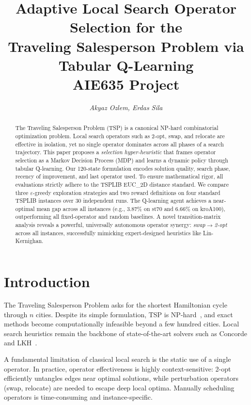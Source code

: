 \documentclass[10pt,twocolumn]{article}
\title{\textbf{Adaptive Local Search Operator Selection for the\\
Traveling Salesperson Problem via Tabular Q-Learning \\AIE635 Project}}
\author{\textit{Akyaz Ozlem, Erdas Sila}}
\date{}
\begin{document}
\maketitle

\begin{abstract}
The Traveling Salesperson Problem (TSP) is a canonical NP-hard combinatorial
optimization problem. Local search operators such as 2-opt, swap, and relocate
are effective in isolation, yet no single operator dominates across all phases
of a search trajectory. This paper proposes a \emph{selection hyper-heuristic}
that frames operator selection as a Markov Decision Process (MDP) and learns a
dynamic policy through tabular Q-learning. Our 120-state formulation encodes
solution quality, search phase, recency of improvement, and last operator used.
To ensure mathematical rigor, all evaluations strictly adhere to the TSPLIB EUC\_2D
distance standard. We compare three $\varepsilon$-greedy exploration strategies 
and two reward definitions on four standard TSPLIB instances over 30 independent runs. 
The Q-learning agent achieves a near-optimal mean gap across all instances (e.g., 3.87\% on st70 and 6.66\% on kroA100), outperforming all fixed-operator and random baselines. A novel
transition-matrix analysis reveals a powerful, universally autonomous operator synergy:
\emph{swap}$\to$\emph{2-opt} across all instances, successfully mimicking expert-designed
heuristics like Lin-Kernighan.
\end{abstract}

\section{Introduction}

The Traveling Salesperson Problem asks for the shortest Hamiltonian cycle
through $n$ cities. Despite its simple formulation, TSP is NP-hard~\cite{garey79},
and exact methods become computationally infeasible beyond a few hundred cities.
Local search heuristics remain the backbone of state-of-the-art solvers such as
Concorde and LKH~\cite{applegate06,helsgott00}.

A fundamental limitation of classical local search is the static use of a
single operator. In practice, operator effectiveness is highly context-sensitive:
2-opt efficiently untangles edges near optimal solutions, while perturbation
operators (swap, relocate) are needed to escape deep local optima. Manually
scheduling operators is time-consuming and instance-specific.
\end{document}
